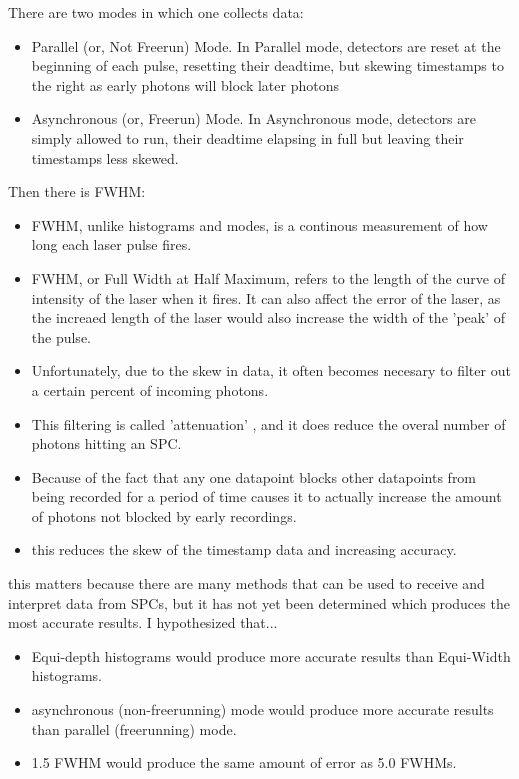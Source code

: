 \documentclass{beamer}
\begin{document}
\begin{frame}
  There are two modes in which one collects data: \cite{sadekar}
  \begin{itemize}
  \item Parallel (or, Not Freerun) Mode. In Parallel mode, detectors are reset at the beginning of each pulse, resetting their deadtime, but skewing timestamps to the right as early photons will block later photons
  \item Asynchronous (or, Freerun) Mode. In Asynchronous mode, detectors are simply allowed to run, their deadtime elapsing in full but leaving their timestamps less skewed.
  \end{itemize}
\end{frame}

\begin{frame}
  Then there is FWHM:
  \begin{itemize}
  \item FWHM, unlike histograms and modes, is a continous measurement of how long each laser pulse fires.
  \item FWHM, or Full Width at Half Maximum, refers to the length of the curve of intensity of the laser when it fires. It can also affect the error of the laser, as the increaed length of the laser would also increase the width of the 'peak' of the pulse.
  \end{itemize}
\end{frame}

\begin{frame}
  \begin{itemize}
  \item Unfortunately, due to the skew in data, it often becomes necesary to filter out a certain percent of incoming photons.
  \item This filtering is called 'attenuation' \cite{ingle}, and it does reduce the overal number of photons hitting an SPC.
  \item Because of the fact that any one datapoint blocks other datapoints from being recorded for a period of time causes it to actually increase the amount of photons not blocked by early recordings.
  \item this reduces the skew of the timestamp data and increasing accuracy. \cite{sadekar}
  \end{itemize}
\end{frame}

\begin{frame}
  this matters because there are many methods that can be used to receive and interpret data from SPCs, but it has not yet been determined which produces the most accurate results.
  I hypothesized that...
  \begin{itemize}
  \item Equi-depth histograms would produce more accurate results than Equi-Width histograms.
  \item asynchronous (non-freerunning) mode would produce more accurate results than parallel (freerunning) mode.
  \item 1.5 FWHM would produce the same amount of error as 5.0 FWHMs.
  \end{itemize}
\end{frame}
\end{document}
